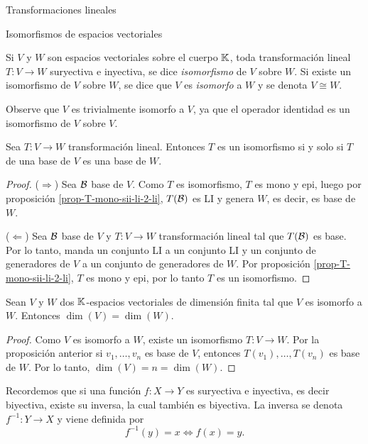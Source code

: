 \begin{chapter}{Transformaciones lineales}
\begin{section}{Isomorfismos de espacios vectoriales}
            

        \begin{definicion}
            Si $V$ y $W$ son espacios vectoriales sobre el cuerpo $\mathbb K$, toda transformación	lineal $T:V \to W$ suryectiva e inyectiva, se dice \textit{isomorfismo} de $V$ sobre $W$. Si existe un isomorfismo de $V$ sobre $W$, se dice que $V$ es \textit{isomorfo} a $W$ y se denota $V \cong W$.
        \end{definicion}
        
        
        
        Observe que $V$ es trivialmente isomorfo a $V$, ya que el operador identidad es un isomorfismo de $V$ sobre $V$. 

        \begin{proposicion}
            Sea $T:V \to W$ transformación lineal. Entonces $T$ es un isomorfismo si y solo si $T$ de una base de $V$ es una base de $W$.
        \end{proposicion}
        \begin{proof} 

         ($\Rightarrow$) 
           Sea $ \mathcal{B}$ base de $V$.  Como $T$ es isomorfismo, $T$ es mono y epi, luego por proposición \ref{prop-T-mono-sii-li-2-li}, $T(\mathcal{B})$ es LI y genera $W$,  es decir,  es base de $W$.

           ($\Leftarrow$) Sea $ \mathcal{B}$ base de $V$ y $T:V \to W$ transformación lineal tal que $T(\mathcal{B})$ es base. Por lo tanto, manda un conjunto LI a un conjunto LI y un conjunto de generadores de $V$ a un conjunto de generadores de $W$. Por proposición \ref{prop-T-mono-sii-li-2-li}, $T$ es mono  y epi, por lo tanto $T$ es un isomorfismo.
        \end{proof}

        \begin{corolario}
            Sean $V$ y $W$ dos  $\mathbb K$-espacios vectoriales de dimensión finita tal que $V$ es isomorfo a $W$. Entonces $\dim(V) = \dim(W)$.
        \end{corolario}
        \begin{proof}
        Como $V$  es isomorfo  a $W$,  existe un isomorfismo $T: V \to W$. Por la proposición anterior si $v_1,\ldots,v_n$ es base de $V$,  entonces $T(v_1),\ldots,T(v_n)$ es base de $W$. Por lo tanto, $\dim(V) = n = \dim(W)$.
        \end{proof}


        Recordemos que si una función $f: X \to Y$ es suryectiva e inyectiva, es decir biyectiva, existe su inversa, la cual también es biyectiva. La inversa se denota $f^{-1}: Y \to X$ y viene definida por
        $$
        f^{-1}(y) = x \Leftrightarrow f(x) =y.
        $$ 
        

\end{section}
\end{chapter}
